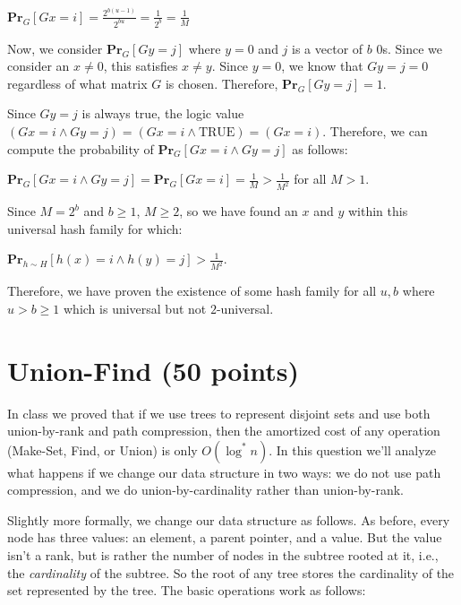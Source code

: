 \documentclass[11pt]{article}
\begin{document}
\begin{enumerate}
$\textbf{Pr}_{G}[Gx = i] = \frac{2^{b(u-1)}}{2^{bu}} = \frac{1}{2^{b}} = \frac{1}{M}$

Now, we consider $\textbf{Pr}_{G}[Gy = j]$ where $y = 0$ and $j$ is a vector of $b$ $0$s. Since we consider an $x \neq 0$, this satisfies $x \neq y$. 
Since $y = 0$, we know that $Gy = j = 0$ regardless of what matrix $G$ is chosen. 
Therefore, $\textbf{Pr}_{G}[Gy = j] = 1$.

Since $Gy = j$ is always true, the logic value $(Gx = i \land Gy = j) = (Gx = i \land \text{TRUE}) = (Gx = i)$. 
Therefore, we can compute the probability of $\textbf{Pr}_{G}[Gx = i \land Gy = j]$ as follows: 

$\textbf{Pr}_{G}[Gx = i \land Gy = j] = \textbf{Pr}_{G}[Gx = i] = \frac{1}{M} > \frac{1}{M^2}$ for all $M > 1$.

Since $M = 2^{b}$ and $b \geq 1$, $M \geq 2$, so we have found an $x$ and $y$ within this universal hash family for which: 

$\textbf{Pr}_{h \sim H}[h(x) = i \land h(y) = j] > \frac{1}{M^2}$.

Therefore, we have proven the existence of some hash family for all $u, b$ where $u > b \geq 1$ which is universal but not $2$-universal.

\end{enumerate}


\section{Union-Find (50 points)}

In class we proved that if we use trees to represent disjoint sets and use both union-by-rank and path compression, then the amortized cost of any operation 
(Make-Set, Find, or Union) is only $O(\log^* n)$.  In this question we'll analyze what happens if we change our data structure in two ways: 
we do not use path compression, and we do union-by-cardinality rather than union-by-rank.

Slightly more formally, we change our data structure as follows.  As before, every node has three values: an element, a parent pointer, and a value. 
But the value isn't a rank, but is rather the number of nodes in the subtree rooted at it, i.e., the \emph{cardinality} of the subtree. 
So the root of any tree stores the cardinality of the set represented by the tree. The basic operations work as follows:
\end{document}
